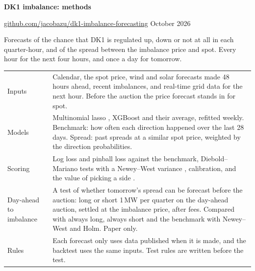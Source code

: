 \documentclass[11pt,a4paper]{article}
\begin{document}
{\sffamily\bfseries\Large DK1 imbalance: methods}\par
\href{https://github.com/jacobazu/dk1-imbalance-forecasting}{github.com/jacobazu/dk1-imbalance-forecasting} \textperiodcentered{} October 2026

Forecasts of the chance that DK1 is regulated up, down or not at all in each quarter-hour, and of the spread between the imbalance price and spot. Every hour for the next four hours, and once a day for tomorrow.

\begin{center}\small
\begin{tabularx}{\linewidth}{@{}lL@{}}
\toprule
Inputs & Calendar, the spot price, wind and solar forecasts made 48 hours ahead, recent imbalances, and real-time grid data for the next hour. Before the auction the price forecast stands in for spot. \\
Models & Multinomial lasso \citep{tibshirani1996,friedman2010}, XGBoost \citep{chen2016} and their average, refitted weekly. Benchmark: how often each direction happened over the last 28 days. Spread: past spreads at a similar spot price, weighted by the direction probabilities. \\
Scoring & Log loss and pinball loss against the benchmark, Diebold--Mariano tests with a Newey--West variance \citep{diebold1995,newey1987}, calibration, and the value of picking a side \citep{bottieau2020}. \\
Day-ahead to imbalance & A test of whether tomorrow's spread can be forecast before the auction: long or short 1\,MW per quarter on the day-ahead auction, settled at the imbalance price, after fees. Compared with always long, always short and the benchmark with Newey--West and Holm. Paper only. \\
Rules & Each forecast only uses data published when it is made, and the backtest uses the same inputs. Test rules are written before the test. \\
\bottomrule
\end{tabularx}
\end{center}
\end{document}
